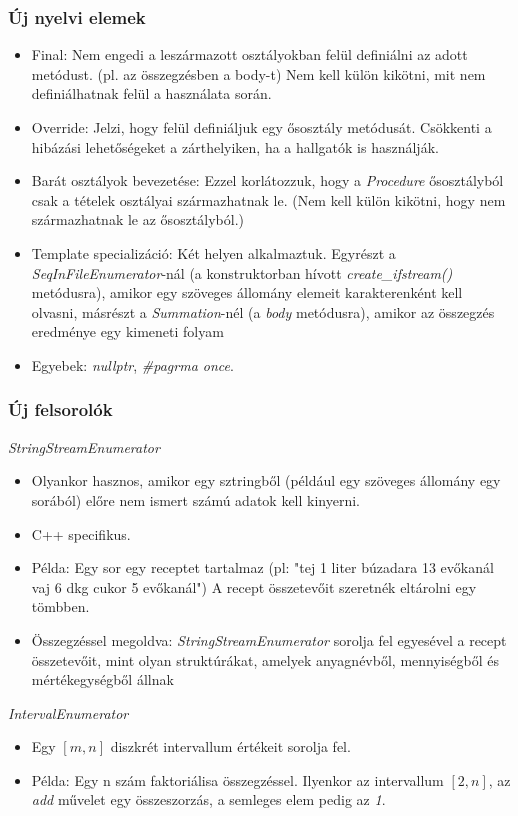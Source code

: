 \documentclass[11pt]{beamer}
\begin{document}
\begin{frame}
	\frametitle{Új nyelvi elemek}
	\begin{itemize}
		\item Final: Nem engedi a leszármazott osztályokban felül definiálni az adott metódust. (pl. az összegzésben a body-t) Nem kell külön kikötni, mit nem definiálhatnak felül a használata során.
		\item Override: Jelzi, hogy felül definiáljuk egy ősosztály metódusát. Csökkenti a hibázási lehetőségeket a zárthelyiken, ha a hallgatók is használják.
		\item Barát osztályok bevezetése: Ezzel korlátozzuk, hogy a \textit{Procedure} ősosztályból csak a tételek osztályai származhatnak le. (Nem kell külön kikötni, hogy nem származhatnak le az ősosztályból.)
		\item Template specializáció: Két helyen alkalmaztuk. Egyrészt a \textit{SeqInFileEnumerator}-nál (a konstruktorban hívott \textit{create\_ifstream()} metódusra), amikor egy szöveges állomány elemeit karakterenként kell olvasni, másrészt a \textit{Summation}-nél (a \textit{body} metódusra), amikor az összegzés eredménye egy kimeneti folyam
		\item Egyebek: \textit{nullptr}, \textit{\#pagrma once}.
	\end{itemize}
\end{frame}

\begin{frame}
	\frametitle{Új felsorolók}
		 \textit{StringStreamEnumerator} 
		 \begin{itemize}
		 	\item Olyankor hasznos, amikor egy sztringből (például egy szöveges állomány egy sorából) előre nem ismert számú adatok kell kinyerni.
		 	\item C++ specifikus.
		 	\item Példa: Egy sor egy receptet tartalmaz (pl: "tej 1 liter búzadara 13 evőkanál vaj 6 dkg cukor 5 evőkanál") A recept összetevőit szeretnék eltárolni egy tömbben.
		 	\item Összegzéssel megoldva: \textit{StringStreamEnumerator} sorolja fel egyesével a recept összetevőit, mint olyan struktúrákat, amelyek anyagnévből, mennyiségből és mértékegységből állnak
		 \end{itemize}
		
		\textit{IntervalEnumerator}
		\begin{itemize}
			\item Egy $[m,n]$ diszkrét intervallum értékeit sorolja fel.
			\item Példa: Egy n szám faktoriálisa összegzéssel. Ilyenkor az intervallum $[2,n]$, az \textit{add} művelet egy összeszorzás, a semleges elem pedig az \textit{1}.
		\end{itemize}
		
\end{frame}
\end{document}
